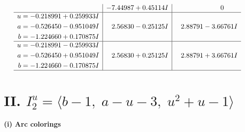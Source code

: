\documentclass[1p]{elsarticle_modified}
\theoremstyle{definition}
\begin{document}
$$\begin{array}{c|c|c}
 & -7.44987 + 0.45114 I & \phantom{-0.000000 } 0 \\ \hline\begin{aligned}
u &= -0.218991 + 0.259933 I \\
a &= -0.526450 - 0.951049 I \\
b &= -1.224660 + 0.170875 I\end{aligned}
 & \phantom{-}2.56830 - 0.25125 I & \phantom{-}2.88791 - 3.66761 I \\ \hline\begin{aligned}
u &= -0.218991 - 0.259933 I \\
a &= -0.526450 + 0.951049 I \\
b &= -1.224660 - 0.170875 I\end{aligned}
 & \phantom{-}2.56830 + 0.25125 I & \phantom{-}2.88791 + 3.66761 I\\
 \hline 
 \end{array}$$\newpage\newpage\renewcommand{\arraystretch}{1}
\centering \section*{II. $I^u_{2}= \langle b-1,\;a- u-3,\;u^2+u-1 \rangle$}
\flushleft \textbf{(i) Arc colorings}\\
\end{document}
